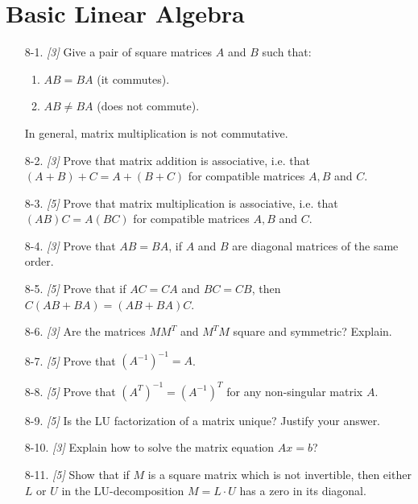 \documentclass[10pt]{article}
\begin{document}
\section{Basic Linear Algebra}
\begin{enumerate}
\item[8-1.] \textit{[3]} Give a pair of square matrices $A$ and $B$ such that:
    \begin{enumerate}
    \item $AB=BA$ (it commutes).
    \item $AB\neq BA$ (does not commute).
    \end{enumerate}
    In general, matrix multiplication is not commutative.

\item[8-2.] \textit{[3]} Prove that matrix addition is associative, i.e. that $(A+B)+C=A+(B+C)$ for compatible matrices $A, B$ and $C$.

\item[8-3.] \textit{[5]} Prove that matrix multiplication is associative, i.e. that $(AB)C=A(BC)$ for compatible matrices $A, B$ and $C$.

\item[8-4.] \textit{[3]} Prove that $AB=BA$, if $A$ and $B$ are diagonal matrices of the same order.

\item[8-5.] \textit{[5]} Prove that if $AC=CA$ and $BC=CB$, then $C(AB+BA)=(AB+BA)C$.

\item[8-6.] \textit{[3]} Are the matrices $MM^{T}$ and $M^{T}M$ square and symmetric? Explain.

\item[8-7.] \textit{[5]} Prove that $\left(A^{-1}\right)^{-1}=A$.

\item[8-8.] \textit{[5]} Prove that $\left(A^{T}\right)^{-1}=\left(A^{-1}\right)^{T}$ for any non-singular matrix $A$.

\item[8-9.] \textit{[5]} Is the LU factorization of a matrix unique? Justify your answer.

\item[8-10.] \textit{[3]} Explain how to solve the matrix equation $Ax=b$?

\item[8-11.] \textit{[5]} Show that if $M$ is a square matrix which is not invertible, then either $L$ or $U$ in the LU-decomposition $M=L \cdot U$ has a zero in its diagonal.

\end{enumerate}
\end{document}
